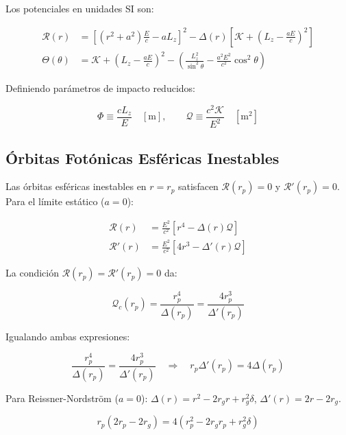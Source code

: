 \documentclass[12pt,a4paper]{article}
\begin{document}
Los potenciales en unidades SI son:

\begin{align}
\mathcal{R}(r) &= \left[ (r^2 + a^2) \frac{E}{c} - a L_z \right]^2 - \Delta(r) \left[ \mathcal{K} + \left(L_z - \frac{a E}{c}\right)^2 \right] \\
\Theta(\theta) &= \mathcal{K} + \left(L_z - \frac{a E}{c}\right)^2 - \left( \frac{L_z^2}{\sin^2\theta} - \frac{a^2 E^2}{c^2} \cos^2\theta \right)
\end{align}

Definiendo parámetros de impacto reducidos:

\begin{equation}
\Phi \equiv \frac{c L_z}{E} \quad [\text{m}], \qquad \mathcal{Q} \equiv \frac{c^2 \mathcal{K}}{E^2} \quad [\text{m}^2]
\end{equation}

\subsection{Órbitas Fotónicas Esféricas Inestables}

Las órbitas esféricas inestables en $r = r_p$ satisfacen $\mathcal{R}(r_p) = 0$ y $\mathcal{R}'(r_p) = 0$. Para el límite estático ($a=0$):

\begin{align}
\mathcal{R}(r) &= \frac{E^2}{c^2} \left[ r^4 - \Delta(r) \mathcal{Q} \right] \\
\mathcal{R}'(r) &= \frac{E^2}{c^2} \left[ 4r^3 - \Delta'(r) \mathcal{Q} \right]
\end{align}

La condición $\mathcal{R}(r_p) = \mathcal{R}'(r_p) = 0$ da:

\begin{equation}
\mathcal{Q}_c(r_p) = \frac{r_p^4}{\Delta(r_p)} = \frac{4r_p^3}{\Delta'(r_p)}
\end{equation}

Igualando ambas expresiones:

\begin{equation}
\frac{r_p^4}{\Delta(r_p)} = \frac{4r_p^3}{\Delta'(r_p)} \quad \Rightarrow \quad r_p \Delta'(r_p) = 4 \Delta(r_p)
\end{equation}

Para Reissner-Nordström ($a=0$): $\Delta(r) = r^2 - 2r_g r + r_g^2 \delta$, $\Delta'(r) = 2r - 2r_g$.

\begin{equation}
r_p (2r_p - 2r_g) = 4(r_p^2 - 2r_g r_p + r_g^2 \delta)
\end{equation}
\end{document}
